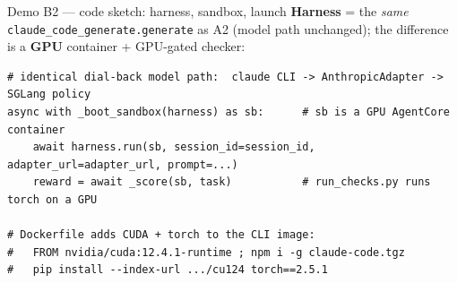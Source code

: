 \documentclass[aspectratio=169]{beamer}
\begin{document}
\begin{frame}[fragile]{Demo B2 --- code sketch: harness, sandbox, launch}
  \footnotesize\textbf{Harness} = the \emph{same} \texttt{claude\_code\_generate.generate} as A2 (model path
  unchanged); the difference is a \textbf{GPU} container + GPU-gated checker:
\begin{lstlisting}[basicstyle=\ttfamily\scriptsize]
# identical dial-back model path:  claude CLI -> AnthropicAdapter -> SGLang policy
async with _boot_sandbox(harness) as sb:      # sb is a GPU AgentCore container
    await harness.run(sb, session_id=session_id, adapter_url=adapter_url, prompt=...)
    reward = await _score(sb, task)           # run_checks.py runs torch on a GPU

# Dockerfile adds CUDA + torch to the CLI image:
#   FROM nvidia/cuda:12.4.1-runtime ; npm i -g claude-code.tgz
#   pip install --index-url .../cu124 torch==2.5.1
\end{lstlisting}
\end{frame}
\end{document}

